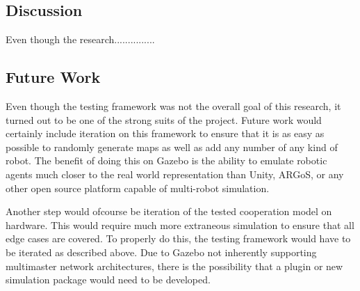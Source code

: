 \subsection{Discussion}

Even though the research...............

\subsection{Future Work}

Even though the testing framework was not the overall goal of this research,
it turned out to be one of the strong suits of the project. Future work would certainly
include iteration on this framework to ensure that it is as easy as possible to
randomly generate maps as well as add any number of any kind of robot. The benefit
of doing this on Gazebo is the ability to emulate robotic agents much closer to the
real world representation than Unity, ARGoS, or any other open source platform
capable of multi-robot simulation.

Another step would ofcourse be iteration of the tested cooperation model on hardware.
This would require much more extraneous simulation to ensure that all edge cases are
covered. To properly do this, the testing framework would have to be iterated as
described above. Due to Gazebo not inherently supporting multimaster network architectures,
there is the possibility that a plugin or new simulation package would need to be
developed.
